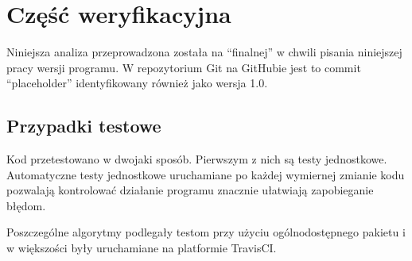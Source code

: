 \section[Weryfikacja]{Część weryfikacyjna}\label{sec:verification} %
    Niniejsza analiza przeprowadzona została na ``finalnej'' w chwili pisania
    niniejszej pracy wersji programu.  W repozytorium Git na GitHubie jest to
    commit ``placeholder''  identyfikowany
    również jako wersja 1.0.

    \subsection{Przypadki testowe}

    Kod przetestowano w dwojaki sposób. Pierwszym z nich są testy jednostkowe.
    Automatyczne testy jednostkowe uruchamiane po każdej wymiernej zmianie kodu
    pozwalają kontrolować działanie programu znacznie ułatwiają zapobieganie
    błędom.

    Poszczególne algorytmy podlegały testom przy użyciu ogólnodostępnego
    pakietu  i w większości były
    uruchamiane na platformie TravisCI\@.

